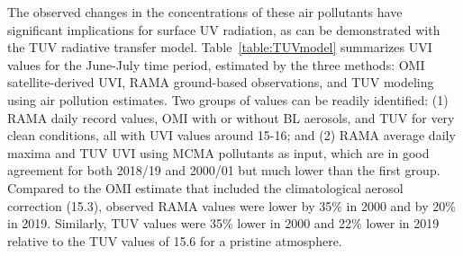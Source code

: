 \documentclass[journal=jacsat,manuscript=article]{achemso}
\begin{document}
The observed changes in the concentrations of these air pollutants have
significant implications for surface UV radiation, as can be
demonstrated with the TUV radiative transfer model.
Table~{\ref{table:TUVmodel}} summarizes UVI values for
the June-July time period, estimated by the three methods: OMI
satellite-derived UVI, RAMA ground-based observations, and TUV modeling
using air pollution estimates. Two groups of values can be readily
identified: (1) RAMA daily record values, OMI with or without BL
aerosols, and TUV for very clean conditions, all with UVI values around
15-16; and (2) RAMA average daily maxima and TUV UVI using MCMA
pollutants as input, which are in good agreement for both 2018/19 and
2000/01 but much lower than the first group. Compared to the OMI
estimate that included the climatological aerosol correction (15.3),
observed RAMA values were lower by 35\% in 2000 and by 20\% in 2019.
Similarly, TUV values were 35\% lower in 2000 and 22\% lower in 2019
relative to the TUV values of 15.6 for a pristine atmosphere.
\end{document}
